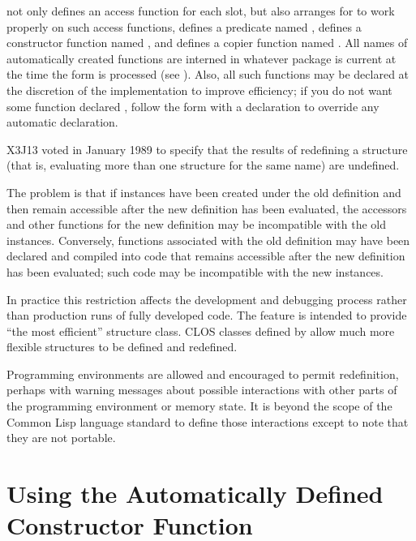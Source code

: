 \begin{defmac}
 not only defines an access function for each slot, but also
arranges for  to work properly on such access functions,
defines a predicate named ,
defines a constructor function named ,
and defines a copier function named .
All names of automatically created functions are interned
in whatever package is current at the time the 
form is processed (see ).
Also, all such functions may be declared 
at the discretion of the implementation to improve efficiency;
if you do not want some function declared ,
follow the  form with a  declaration
to override any automatic  declaration.

\begin{newer}
X3J13 voted in January 1989 
to specify that the results of redefining a  structure
(that is, evaluating more than one  structure
for the same name) are undefined.

The problem is that if instances have been created under the old definition
and then remain accessible after the new definition has been evaluated,
the accessors and other functions for the new definition may be incompatible
with the old instances.  Conversely, functions associated with the
old definition may have been declared  and compiled
into code that remains accessible after the new definition has been
evaluated; such code may be incompatible with the new instances.

In practice this restriction affects the development
and debugging process rather than production runs of fully developed code.
The  feature is intended to provide
``the most efficient'' structure class.
CLOS classes defined by 
allow much more flexible structures to be defined and redefined.

Programming environments are allowed and encouraged to permit 
redefinition, perhaps with warning messages about possible interactions
with other parts of the programming environment or memory state.
It is beyond the scope of the Common Lisp
language standard to define those interactions except to note that they
are not portable.
\end{newer}
\end{defmac}

\section{Using the Automatically Defined Constructor Function}

